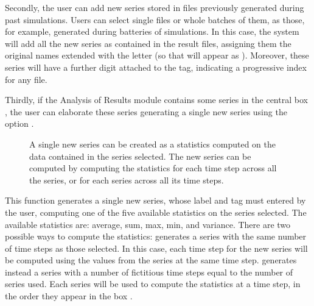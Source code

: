 \documentclass [11pt,a4paper] {book}
\begin{document}
Secondly, the user can add new series stored in files previously generated during past simulations. Users can select single files or whole batches of them, as those, for example, generated during batteries of simulations. In this case, the system will add all the new series as contained in the result files, assigning them the original names extended with the letter  (so that  will appear as ). Moreover, these series will have a further digit attached to the tag, indicating a progressive index for any file.

Thirdly, if the Analysis of Results module contains some series in the central box , the user can elaborate these series generating a single new series using the option .

\begin{figure}[ht]
  \centering
  \caption{\small A single new series can be created as a statistics computed on the data contained in the series selected. The new series can be computed by computing the statistics for each time step across all the series, or for each series across all its time steps.}
  \label{fig:create_series}
\end{figure}

This function generates a single new series, whose label and tag must entered by the user, computing one of the five available statistics on the series selected. The available statistics are: average, sum, max, min, and variance. There are two possible ways to compute the statistics:  generates a series with the same number of time steps as those selected. In this case, each time step for the new series will be computed using the values from the series at the same time step.  generates instead a series with a number of fictitious time steps equal to the number of series used. Each series will be used to compute the statistics at a time step, in the order they appear in the box .
\end{document}
